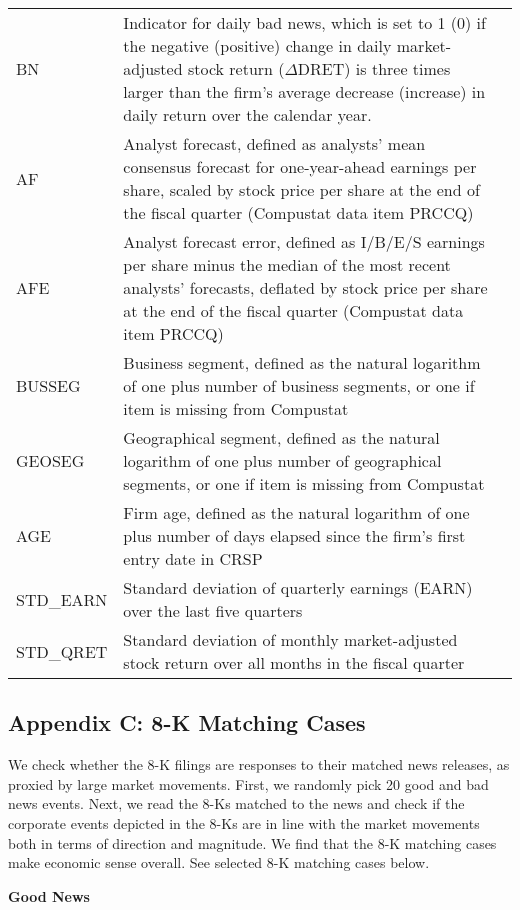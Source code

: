 \begin{table}[H]
\begin{tabular}{lp{15cm}p{15cm}}
		BN & Indicator for daily bad news, which is set to 1 (0) if the negative (positive) change in daily market-adjusted stock return ($\Delta$DRET) is three times larger than the firm’s average decrease (increase) in daily return over the calendar year.\\
		AF & Analyst forecast, defined as analysts' mean consensus forecast for one-year-ahead earnings per share, scaled by stock price per share at the end of the fiscal quarter (Compustat data item PRCCQ)\\
		AFE & Analyst forecast error, defined as I/B/E/S earnings per share minus the median of the most recent analysts' forecasts, deflated by stock price per share at the end of the fiscal quarter (Compustat data item PRCCQ)\\
		BUSSEG & Business segment, defined as the natural logarithm of one plus number of business segments, or one if item is missing from Compustat\\
		GEOSEG & Geographical segment, defined as the natural logarithm of one plus number of geographical segments, or one if item is missing from Compustat\\
		AGE & Firm age, defined as the natural logarithm of one plus number of days elapsed since the firm's first entry date in CRSP\\
		STD\_EARN & Standard deviation of quarterly earnings (EARN) over the last five quarters\\
		STD\_QRET & Standard deviation of monthly market-adjusted stock return over all months in the fiscal quarter\\
		\bottomrule
		\bottomrule
	\end{tabular}%
\end{table}%

\newpage
\subsection*{Appendix C: 8-K Matching Cases}
\label{appc}
We check whether the 8-K filings are responses to their matched news releases, as proxied by large market movements. First, we randomly pick 20 good and bad news events. Next, we read the 8-Ks matched to the news and check if the corporate events depicted in the 8-Ks are in line with the market movements both in terms of direction and magnitude. We find that the 8-K matching cases make economic sense overall. See selected 8-K matching cases below.
\begin{center}
	\textbf{Good News}
\end{center}
